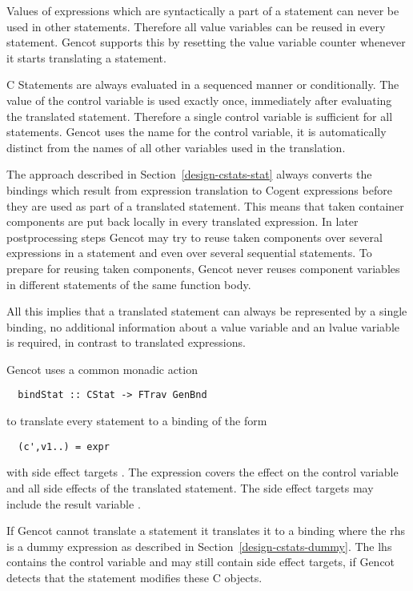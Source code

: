 Values of expressions which are syntactically a part of a statement can never be used in other statements. Therefore
all value variables can be reused in every statement. Gencot supports this by resetting the value variable counter 
whenever it starts translating a statement.

C Statements are always evaluated in a sequenced manner or conditionally. The value of the control variable is used exactly
once, immediately after evaluating the translated statement. Therefore a single control variable is sufficient for 
all statements. Gencot uses the name  for the control variable, it is automatically distinct from the names of
all other variables used in the translation.

The approach described in Section~\ref{design-cstats-stat} always converts the bindings which result from expression 
translation to Cogent expressions before they are used as part of a translated statement. This means that taken
container components are put back locally in every translated expression. In later postprocessing steps Gencot may
try to reuse taken components over several expressions in a statement and even over several sequential statements.
To prepare for reusing taken components, Gencot never reuses component variables in different statements of the same
function body.

All this implies that a translated statement can always be represented by a single binding, no additional information
about a value variable and an lvalue variable is required, in contrast to translated expressions.

Gencot uses a common monadic action 
\begin{verbatim}
  bindStat :: CStat -> FTrav GenBnd
\end{verbatim}
to translate every statement to a binding of the form
\begin{verbatim}
  (c',v1..) = expr
\end{verbatim}
with side effect targets . The expression  covers the effect on the control variable and 
all side effects of the translated statement. The side effect targets may include the result variable .

If Gencot cannot translate a statement it translates it to a binding where the rhs is a dummy expression as described in 
Section~\ref{design-cstats-dummy}. The lhs contains the control variable and may still contain side effect targets, if 
Gencot detects that the statement modifies these C objects.

